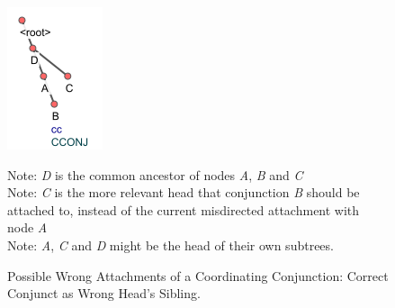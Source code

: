 \begin{figure}[H]
    \centering
    \includegraphics{img/nested1.png}
    \caption[Possible Wrong Attachments of a Coordinating Conjunction: Correct Conjunct as Wrong Head's Sibling]{Possible Wrong Attachments of a Coordinating Conjunction: Correct Conjunct as Wrong Head's Sibling.}
        Note: \textit{D} is the common ancestor of nodes \textit{A}, \textit{B} and \textit{C}\\
        Note: \textit{C} is the more relevant head that conjunction \textit{B} should be attached to, instead of the current misdirected attachment with node \textit{A}\\
        Note: \textit{A}, \textit{C} and \textit{D} might be the head of their own subtrees.
    \label{fig:conj-head1}
\end{figure}

